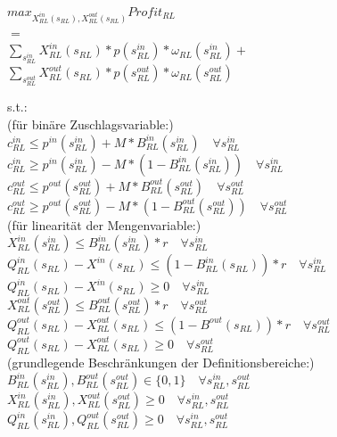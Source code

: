 \documentclass{article}
\begin{document}
\begin{center}
$max_{X^{in}_{RL}(s_{RL}), X^{out}_{RL}(s_{RL})} Profit_{RL}$\\ 
$=$\\
$\sum_{s^{in}_{RL}} X^{in}_{RL}(s_{RL}) * p(s^{in}_{RL}) * \omega_{RL}(s^{in}_{RL}) +$\\
$\sum_{s^{out}_{RL}} X^{out}_{RL}(s_{RL}) * p(s^{out}_{RL}) * \omega_{RL}(s^{out}_{RL})$\\
\end{center}
s.t.:\\
(für binäre Zuschlagsvariable:)\\
$c^{in}_{RL} \leq p^{in}(s^{in}_{RL}) + M * B^{in}_{RL}(s^{in}_{RL})\quad\forall s^{in}_{RL} $ \\
$c^{in}_{RL} \geq p^{in}(s^{in}_{RL}) - M * (1 - B^{in}_{RL}(s^{in}_{RL}))\quad\forall s^{in}_{RL} $ \\
$c^{out}_{RL} \leq p^{out}(s^{out}_{RL}) + M * B^{out}_{RL}(s^{out}_{RL})\quad\forall s^{out}_{RL} $ \\
$c^{out}_{RL} \geq p^{out}(s^{out}_{RL}) - M * (1 - B^{out}_{RL}(s^{out}_{RL}))\quad\forall s^{out}_{RL}$  \\
(für linearität der Mengenvariable:)\\
$X^{in}_{RL}(s^{in}_{RL}) \leq B^{in}_{RL}(s^{in}_{RL}) * r \quad\forall s^{in}_{RL}$\\
$Q^{in}_{RL}(s_{RL}) - X^{in}(s_{RL}) \leq (1 - B^{in}_{RL}(s_{RL})) * r \quad\forall s^{in}_{RL}$\\
$Q^{in}_{RL}(s_{RL}) - X^{in}(s_{RL}) \geq 0 \quad\forall s^{in}_{RL}$\\
$X^{out}_{RL}(s^{out}_{RL}) \leq B^{out}_{RL}(s^{out}_{RL}) * r \quad\forall s^{out}_{RL}$\\
$Q^{out}_{RL}(s_{RL}) - X^{out}_{RL}(s_{RL}) \leq (1 - B^{out}(s_{RL})) * r \quad\forall s^{out}_{RL}$\\
$Q^{out}_{RL}(s_{RL}) - X^{out}_{RL}(s_{RL}) \geq 0\quad\forall s^{out}_{RL} $\\
(grundlegende Beschränkungen der Definitionsbereiche:)\\
$B^{in}_{RL}(s^{in}_{RL}),B^{out}_{RL}(s^{out}_{RL}) \in \{0,1\}\quad\forall s^{in}_{RL},s^{out}_{RL} $\\
$X^{in}_{RL}(s^{in}_{RL}),X^{out}_{RL}(s^{out}_{RL}) \geq 0 \quad\forall s^{in}_{RL},s^{out}_{RL} $\\
$Q^{in}_{RL}(s^{in}_{RL}),Q^{out}_{RL}(s^{out}_{RL}) \geq 0\quad\forall  s^{in}_{RL},s^{out}_{RL} $\\
\end{document}
